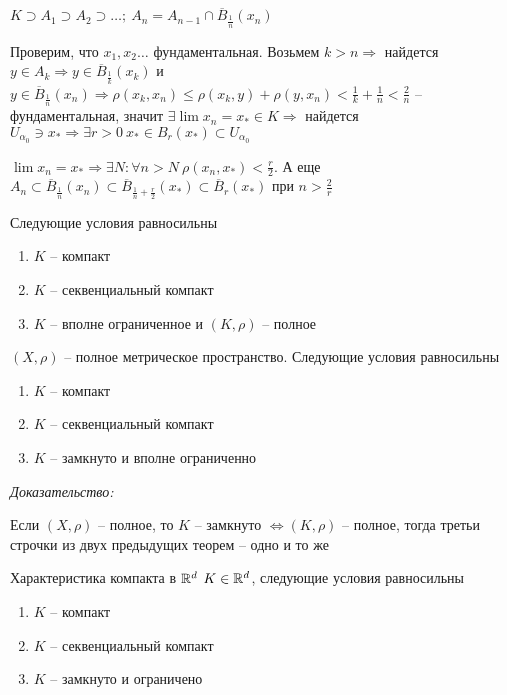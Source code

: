 \documentclass[12pt]{article}
\begin{document}
$K \supset A_1 \supset A_2 \supset \ldots;\ A_n = A_{n - 1} \cap \overline{B}_{\frac{1}{n}}(x_n)$

Проверим, что $x_1, x_2 \ldots$ фундаментальная. Возьмем $k > n \Rightarrow$ найдется $y \in A_k \Rightarrow y \in \overline{B}_{\frac{1}{k}}(x_k)$ и $y \in \overline{B}_{\frac{1}{n}}(x_n) \Rightarrow \rho(x_k, x_n) \leq \rho(x_k, y) + \rho(y, x_n) < \frac{1}{k} + \frac{1}{n} < \frac{2}{n}$ -- фундаментальная, значит $\exists \lim x_n = x_* \in K \Rightarrow$ найдется $U_{\alpha_0} \ni x_* \Rightarrow \exists r > 0\ x_* \in B_r(x_*) \subset U_{\alpha_0}$

$\lim x_n = x_* \Rightarrow \exists N : \forall n > N\ \rho(x_n, x_*) < \frac{r}{2}$. А еще $A_n \subset \overline{B}_{\frac{1}{n}}(x_n) \subset \overline{B}_{\frac{1}{n} + \frac{r}{2}}(x_*) \subset \overline{B}_{r}(x_*)$ при $n > \frac{2}{r}$

\begin{theo}{Следующие условия равносильны}
    \begin{enumerate}
        \item $K$ -- компакт
        \item $K$ -- секвенциальный компакт
        \item $K$ -- вполне ограниченное и $(K, \rho)$ -- полное
    \end{enumerate}
\end{theo}

\begin{theo}{}
    $(X, \rho)$ -- полное метрическое пространство. Следующие условия равносильны

    \begin{enumerate}
        \item $K$ -- компакт
        \item $K$ -- секвенциальный компакт
        \item $K$ -- замкнуто и вполне ограниченно
    \end{enumerate}
\end{theo}

\textit{Доказательство:}

Если $(X, \rho)$ -- полное, то $K$ -- замкнуто $\Leftrightarrow (K, \rho)$ -- полное, тогда третьи строчки из двух предыдущих теорем -- одно и то же

\begin{theo}{Характеристика компакта в $\mathbb R^d$}
    $K \in \mathbb R^d$, следующие условия равносильны

    \begin{enumerate}
        \item $K$ -- компакт
        \item $K$ -- секвенциальный компакт
        \item $K$ -- замкнуто и ограничено 
    \end{enumerate}
\end{theo}
\end{document}

